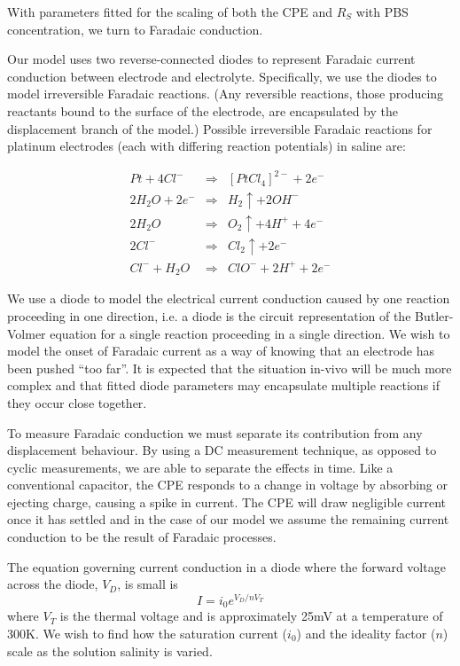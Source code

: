 \documentclass[journal, a4paper]{IEEEtran}
\begin{document}
With parameters fitted for the scaling of both the CPE and $R_{S}$ with PBS concentration, we turn to Faradaic conduction.

Our model uses two reverse-connected diodes to represent Faradaic current conduction between electrode and electrolyte. Specifically, we use the diodes to model irreversible Faradaic reactions. (Any reversible reactions, those producing reactants bound to the surface of the electrode, are encapsulated by the displacement branch of the model.)
Possible irreversible Faradaic reactions for platinum electrodes {\color{blue}(each with differing reaction potentials)} in saline are:

\begin{align}
    Pt + 4Cl^{-} &\Rightarrow& [PtCl_{4}]^{2-} + 2 e^{-} \label{eqn:ptCl}\\
    2H_{2}O + 2 e^{-} &\Rightarrow& H_{2}\uparrow + 2OH^{-} \label{eqn:H20}\\
    2H_{2}O &\Rightarrow& O_{2}\uparrow + 4H^{+} + 4e^{-} \label{eqn:2H20}\\
    2Cl^{-} &\Rightarrow& Cl_{2}\uparrow + 2e^{-} \label{eqn:Cl} \\
    Cl^{-} + H_{2}O &\Rightarrow& ClO^{-} + 2H^{+} + 2e^{-} \label{eqn:ClH20}
\end{align}

{
    \color{blue}
We use a diode to model the electrical current conduction caused by one reaction proceeding in one direction, i.e. a diode is the circuit representation of the Butler-Volmer equation for a single reaction proceeding in a single direction. 
    We wish to model the onset of Faradaic current as a way of knowing that an electrode has been pushed ``too far''. It is expected that the situation in-vivo will be much more complex and that fitted diode parameters may encapsulate multiple reactions if they occur close together.
}

{\color{blue} To measure Faradaic conduction we must separate its contribution from any displacement behaviour.} By using a DC measurement technique, as opposed to cyclic measurements, we are able to separate the effects in time.
Like a conventional capacitor, the CPE responds {\color{blue} to a change in voltage by absorbing or ejecting charge, causing a spike in current}. The CPE will draw negligible current once it has settled and in the case of our model we assume the remaining current conduction to be the result of Faradaic processes.

The equation governing current conduction in a diode where the forward voltage across the diode, $V_{D}$, is small is
\begin{equation}
    I = i_{0}  e^{V_{D} / n V_{T}}
\end{equation}
where $V_{T}$ is the thermal voltage and is approximately 25\thinspace mV at a temperature of 300\thinspace K. We wish to find how the saturation current ($i_{0}$) and the ideality factor ($n$) scale as the solution salinity is varied.
\end{document}
